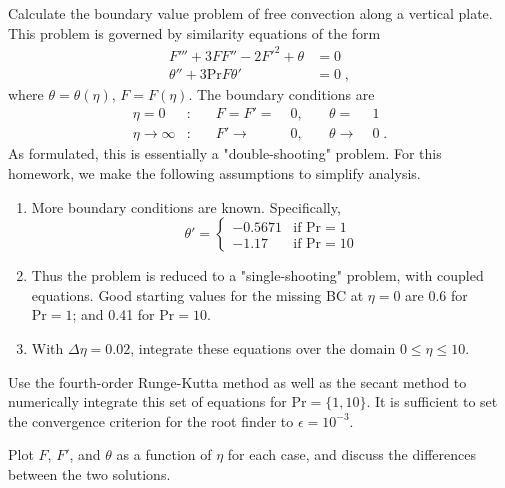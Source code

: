 \documentclass[12pt]{article}
\begin{document}
Calculate the boundary value problem of free convection along a vertical plate. This problem is governed by similarity equations of the form
\begin{equation}
\begin{aligned}
F''' + 3 F F'' - 2F'^2 + \theta &= 0 \\
\theta'' + 3 \text{Pr} F \theta' &= 0
\;,
\end{aligned}
\end{equation}
where $\theta = \theta(\eta)$, $F = F(\eta)$. The boundary conditions are
\begin{equation}
\begin{aligned}
\eta = 0 &: &\quad F = F' =\; &0, &\quad \theta =\; &1 \\
\eta \rightarrow \infty &: &\quad F' \rightarrow\; &0, &\quad \theta \rightarrow\; &0
\;.
\end{aligned}
\end{equation}
As formulated, this is essentially a "double-shooting" problem. For this homework, we make the following assumptions to simplify analysis.
\begin{enumerate}
\item More boundary conditions are known. Specifically,
\begin{equation}
\theta' =
\begin{cases}
-0.5671 &\text{if Pr} = 1 \\
-1.17 &\text{if Pr} = 10
\end{cases}
\end{equation}
\item Thus the problem is reduced to a "single-shooting" problem, with coupled equations. Good starting values for the missing BC at $\eta = 0$ are 0.6 for $\text{Pr} = 1$; and 0.41 for $\text{Pr} = 10$.
\item With $\Delta\eta = 0.02$, integrate these equations over the domain $0 \le \eta \le 10$.
\end{enumerate}

Use the fourth-order Runge-Kutta method as well as the secant method to numerically integrate this set of equations for $\text{Pr} = \{1,10\}$. It is sufficient to set the convergence criterion for the root finder to $\epsilon = 10^{-3}$.

Plot $F$, $F'$, and $\theta$ as a function of $\eta$ for each case, and discuss the differences between the two solutions.

\end{document}
